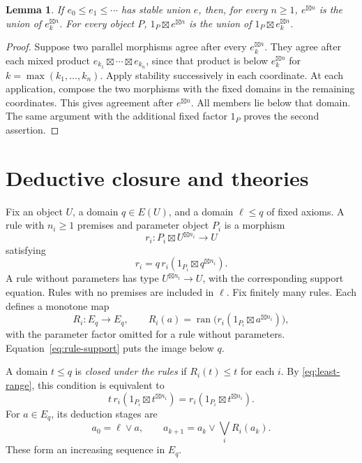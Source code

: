 \documentclass[11pt]{article}
\newtheorem{lemma}[theorem]{Lemma}
\theoremstyle{definition}
\newcommand{\ran}{\operatorname{ran}}
\begin{document}
\begin{lemma}\label{lem:chain-powers}
If $e_0\le e_1\le\cdots$ has stable union $e$, then, for every $n\ge1$,
$e^{\boxtimes n}$ is the union of $e_k^{\boxtimes n}$. For every object $P$,
$1_P\boxtimes e^{\boxtimes n}$ is the union of
$1_P\boxtimes e_k^{\boxtimes n}$.
\end{lemma}
\begin{proof}
Suppose two parallel morphisms agree after every $e_k^{\boxtimes n}$.
They agree after each mixed product
$e_{k_1}\boxtimes\cdots\boxtimes e_{k_n}$, since that product is below
$e_k^{\boxtimes n}$ for $k=\max(k_1,\ldots,k_n)$. Apply stability successively
in each coordinate. At each application, compose the two morphisms with the
fixed domains in the remaining coordinates. This gives agreement after
$e^{\boxtimes n}$. All members lie below that domain. The same argument
with the additional fixed factor $1_P$ proves the second assertion.
\end{proof}

\section{Deductive closure and theories}

Fix an object $U$, a domain $q\in E(U)$, and a domain $\ell\le q$ of fixed
axioms. A rule with $n_i\ge1$ premises and parameter object $P_i$ is a
morphism
\[
 r_i:P_i\boxtimes U^{\boxtimes n_i}\longrightarrow U
\]
satisfying
\begin{equation}\label{eq:rule-support}
 r_i=q\,r_i(1_{P_i}\boxtimes q^{\boxtimes n_i}).
\end{equation}
A rule without parameters has type $U^{\boxtimes n_i}\to U$, with the
corresponding support equation. Rules with no premises are included in
$\ell$. Fix finitely many rules. Each defines a monotone map
\[
 R_i:E_q\longrightarrow E_q,\qquad
 R_i(a)=\ran\bigl(r_i(1_{P_i}\boxtimes a^{\boxtimes n_i})\bigr),
\]
with the parameter factor omitted for a rule without parameters.
Equation~\eqref{eq:rule-support} puts the image below $q$.

A domain $t\le q$ is \emph{closed under the rules} if $R_i(t)\le t$ for
each $i$. By \eqref{eq:least-range}, this condition is equivalent to
\[
 t\,r_i(1_{P_i}\boxtimes t^{\boxtimes n_i})
 =r_i(1_{P_i}\boxtimes t^{\boxtimes n_i}).
\]
For $a\in E_q$, its deduction stages are
\begin{equation}\label{eq:stages}
 a_0=\ell\vee a,\qquad
 a_{k+1}=a_k\vee\bigvee_i R_i(a_k).
\end{equation}
These form an increasing sequence in $E_q$.
\end{document}
